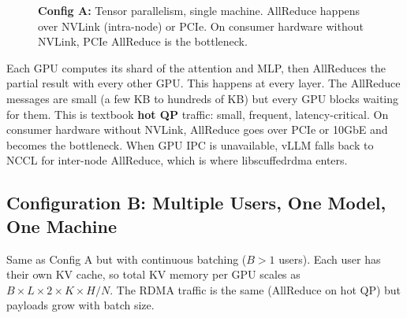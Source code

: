 \documentclass[11pt]{article}
\begin{document}
\begin{figure}[ht]
{
}
\caption{\textbf{Config A:} Tensor parallelism, single machine. AllReduce happens over NVLink (intra-node) or PCIe. On consumer hardware without NVLink, PCIe AllReduce is the bottleneck.}
\label{fig:config_a}
\end{figure}

Each GPU computes its shard of the attention and MLP, then AllReduces the partial result with every other GPU. This happens at every layer. The AllReduce messages are small (a few KB to hundreds of KB) but every GPU blocks waiting for them. This is textbook \textbf{hot QP} traffic: small, frequent, latency-critical. On consumer hardware without NVLink, AllReduce goes over PCIe or 10GbE and becomes the bottleneck. When GPU IPC is unavailable, vLLM falls back to NCCL for inter-node AllReduce, which is where libscuffedrdma enters.

\subsection{Configuration B: Multiple Users, One Model, One Machine}

Same as Config A but with continuous batching ($B > 1$ users). Each user has their own KV cache, so total KV memory per GPU scales as $B \times L \times 2 \times K \times H / N$. The RDMA traffic is the same (AllReduce on hot QP) but payloads grow with batch size.
\end{document}
